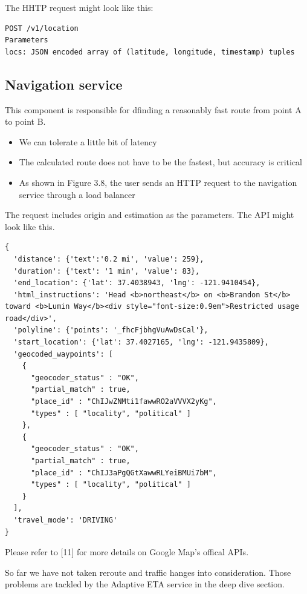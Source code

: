\documentclass{report}
\theoremstyle{definition}
\let\oldsubsection\subsection
\renewcommand{\subsection}{\oldsubsection*}
\begin{document}
The HHTP request might look like this:

\begin{lstlisting}
POST /v1/location
Parameters
locs: JSON encoded array of (latitude, longitude, timestamp) tuples
\end{lstlisting}

\subsection{Navigation service}

This component is responsible for dfinding a reasonably fast route from point A to point B.

\begin{itemize}
\item
We can tolerate a little bit of latency
\item
The calculated route does not have to be the fastest, but accuracy is critical
\item
As shown in Figure 3.8, the user sends an HTTP request to the navigation service through a load balancer
\end{itemize}

The request includes origin and estimation as the parameters. The API might look like this.

\begin{lstlisting}
{
  'distance': {'text':'0.2 mi', 'value': 259},
  'duration': {'text': '1 min', 'value': 83},
  'end_location': {'lat': 37.4038943, 'lng': -121.9410454},
  'html_instructions': 'Head <b>northeast</b> on <b>Brandon St</b> toward <b>Lumin Way</b><div style="font-size:0.9em">Restricted usage road</div>',
  'polyline': {'points': '_fhcFjbhgVuAwDsCal'},
  'start_location': {'lat': 37.4027165, 'lng': -121.9435809},
  'geocoded_waypoints': [
    {
      "geocoder_status" : "OK",
      "partial_match" : true,
      "place_id" : "ChIJwZNMti1fawwRO2aVVVX2yKg",
      "types" : [ "locality", "political" ]
    },
    {
      "geocoder_status" : "OK",
      "partial_match" : true,
      "place_id" : "ChIJ3aPgQGtXawwRLYeiBMUi7bM",
      "types" : [ "locality", "political" ]
    }
  ],
  'travel_mode': 'DRIVING'
}
\end{lstlisting}

Please refer to [11] for more details on Google Map's offical APIs.

So far we have not taken reroute and traffic hanges into consideration. Those problems are tackled by the Adaptive ETA service in the deep dive section.
\end{document}
